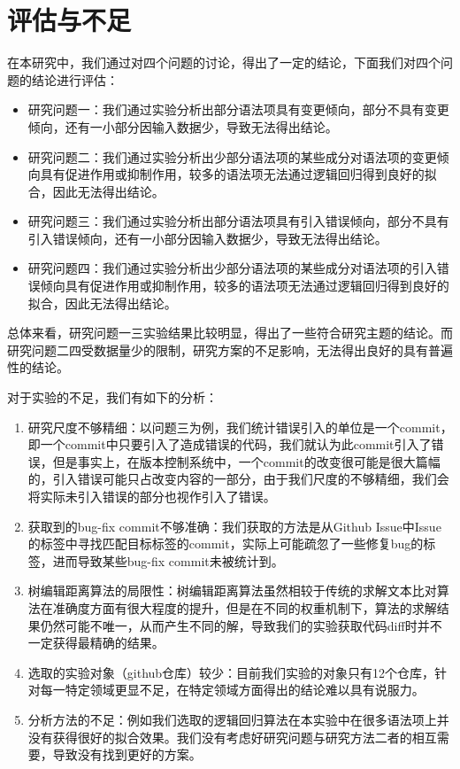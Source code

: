 \chapter{评估与不足}
在本研究中，我们通过对四个问题的讨论，得出了一定的结论，下面我们对四个问题的结论进行评估：
\begin{itemize}
    \item 研究问题一：我们通过实验分析出部分语法项具有变更倾向，部分不具有变更倾向，还有一小部分因输入数据少，导致无法得出结论。
    \item 研究问题二：我们通过实验分析出少部分语法项的某些成分对语法项的变更倾向具有促进作用或抑制作用，较多的语法项无法通过逻辑回归得到良好的拟合，因此无法得出结论。
    \item 研究问题三：我们通过实验分析出部分语法项具有引入错误倾向，部分不具有引入错误倾向，还有一小部分因输入数据少，导致无法得出结论。
    \item 研究问题四：我们通过实验分析出少部分语法项的某些成分对语法项的引入错误倾向具有促进作用或抑制作用，较多的语法项无法通过逻辑回归得到良好的拟合，因此无法得出结论。
\end{itemize}

总体来看，研究问题一三实验结果比较明显，得出了一些符合研究主题的结论。而研究问题二四受数据量少的限制，研究方案的不足影响，无法得出良好的具有普遍性的结论。

对于实验的不足，我们有如下的分析：
\begin{enumerate}
    \item 研究尺度不够精细：以问题三为例，我们统计错误引入的单位是一个commit，即一个commit中只要引入了造成错误的代码，我们就认为此commit引入了错误，但是事实上，在版本控制系统中，一个commit的改变很可能是很大篇幅的，引入错误可能只占改变内容的一部分，由于我们尺度的不够精细，我们会将实际未引入错误的部分也视作引入了错误。
    \item 获取到的bug-fix commit不够准确：我们获取的方法是从Github Issue中Issue的标签中寻找匹配目标标签的commit，实际上可能疏忽了一些修复bug的标签，进而导致某些bug-fix commit未被统计到。
    \item 树编辑距离算法的局限性：树编辑距离算法虽然相较于传统的求解文本比对算法在准确度方面有很大程度的提升，但是在不同的权重机制下，算法的求解结果仍然可能不唯一，从而产生不同的解，导致我们的实验获取代码diff时并不一定获得最精确的结果。
    \item 选取的实验对象（github仓库）较少：目前我们实验的对象只有12个仓库，针对每一特定领域更显不足，在特定领域方面得出的结论难以具有说服力。
    \item 分析方法的不足：例如我们选取的逻辑回归算法在本实验中在很多语法项上并没有获得很好的拟合效果。我们没有考虑好研究问题与研究方法二者的相互需要，导致没有找到更好的方案。
\end{enumerate}


